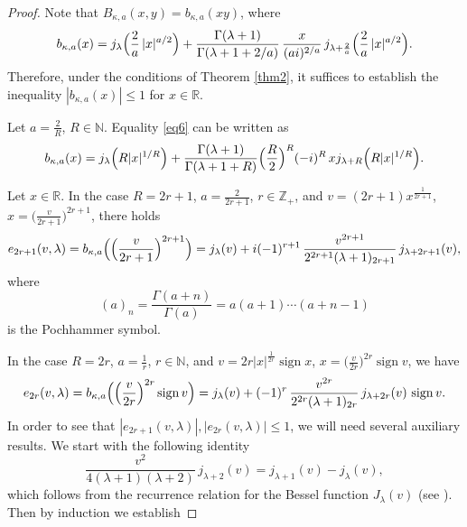 \documentclass[12pt,twoside,reqno]{amsart}\usepackage[cp1251]{inputenc}
\theoremstyle{plain}
\theoremstyle{remark}
\newcommand\sign{\operatorname{sign}}
\begin{document}
\begin{proof}
Note that $B_{\kappa,a}(x,y)=b_{\kappa,a}(xy)$, where
\begin{equation}\label{eq6}
b_{\kappa,a}(x)=j_{\lambda}\Bigl(\frac{2}{a}\,|x|^{a/2}\Bigr)+
\frac{\Gamma(\lambda+1)}{\Gamma(\lambda+1+2/a)}\,\frac{x}{(ai)^{2/a}}\,
j_{\lambda+\frac{2}{a}}\Bigl(\frac{2}{a}\,|x|^{a/2}\Bigr).
\end{equation}
Therefore, under the conditions of Theorem \ref{thm2}, it suffices  to establish the inequality $|b_{\kappa,a}(x)|\le 1$ for $x\in\mathbb{R}$.

Let $a=\frac{2}{R}$, $R\in\mathbb{N}$.
Equality \eqref{eq6} can be written as
\[
b_{\kappa,a}(x)=j_{\lambda}\Bigl(R|x|^{1/R}\Bigr)+
\frac{\Gamma(\lambda+1)}{\Gamma(\lambda+1+R)}\Bigl(\frac{R}{2}\Bigr)^{R}(-i)^{R}\,x
j_{\lambda+R}\Bigl(R|x|^{1/R}\Bigr).
\]

Let $x\in\mathbb{R}$. In the case  $R=2r+1$, $a=\frac{2}{2r+1}$, $r\in\mathbb{Z}_{+}$, and $v=(2r+1)x^{\frac{1}{2r+1}}$, $x=\bigl(\frac{v}{2r+1}\bigr)^{2r+1}$, there holds
\begin{equation}\label{eq7}
e_{2r+1}(v,\lambda)=b_{\kappa,a}\Bigl(\Bigl(\frac{v}{2r+1}\Bigr)^{2r+1}\Bigr)=j_{\lambda}(v)+
i(-1)^{r+1}\,\frac{v^{2r+1}}{2^{2r+1}(\lambda+1)_{2r+1}}\,
j_{\lambda+2r+1}(v),
\end{equation}
where
\[
(a)_n=\frac{\Gamma(a+n)}{\Gamma(a)}=a(a+1)\cdots(a+n-1)
\]
is the Pochhammer symbol.

In the case $R=2r$, $a=\frac{1}{r}$, $r\in\mathbb{N}$, and $v=2r|x|^{\frac{1}{2r}}\sign{}x$, $x=\big(\frac{v}{2r}\big)^{2r}\sign{}v$,
we have
\begin{equation}\label{eq8}
e_{2r}(v,\lambda)=b_{\kappa,a}\Bigl(\Bigl(\frac{v}{2r}\Bigr)^{2r}\sign{}v\Bigr)=j_{\lambda}(v)+
(-1)^{r}\,\frac{v^{2r}}{2^{2r}(\lambda+1)_{2r}}\,j_{\lambda+2r}(v)\,\sign{}v.
\end{equation}
In order to see that $|e_{2r+1}(v,\lambda)|, |e_{2r}(v,\lambda)|\le 1$, we will need several auxiliary results.
We start with   %
  the following identity
\begin{equation}\label{eq9}
\frac{v^2}{4(\lambda+1)(\lambda+2)}\,j_{\lambda+2}(v)=j_{\lambda+1}(v)-j_{\lambda}(v),
\end{equation}
which follows from the  recurrence relation for the Bessel function
$J_{\lambda}(v)$ (see \cite[Chapter~III, 3.2]{Wa66}). Then  by induction we establish


\end{proof}
\end{document}
